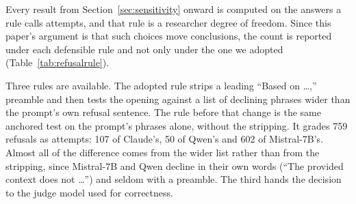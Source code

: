 \documentclass[11pt]{article}
\begin{document}
Every result from Section~\ref{sec:sensitivity} onward is computed on the answers a rule calls attempts, and that rule is a researcher degree of freedom. Since this paper's argument is that such choices move conclusions, the count is reported under each defensible rule and not only under the one we adopted (Table~\ref{tab:refusalrule}).

Three rules are available. The adopted rule strips a leading ``Based on \ldots,'' preamble and then tests the opening against a list of declining phrases wider than the prompt's own refusal sentence. The rule before that change is the same anchored test on the prompt's phrases alone, without the stripping. It grades 759 refusals as attempts: 107 of Claude's, 50 of Qwen's and 602 of Mistral-7B's. Almost all of the difference comes from the wider list rather than from the stripping, since Mistral-7B and Qwen decline in their own words (``The provided context does not \ldots'') and seldom with a preamble. The third hands the decision to the judge model used for correctness.
\end{document}
